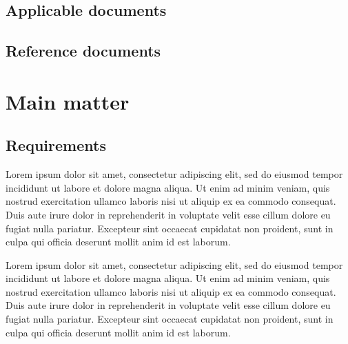 \documentclass[12pt,a4paper]{report}
\begin{document}
\section{Applicable documents}
\begin{ADlist}
\end{ADlist}


\section{Reference documents}
\begin{RDlist}
\end{RDlist}



\chapter{Main matter}

\section{Requirements}
Lorem ipsum dolor sit amet, consectetur adipiscing elit, sed do eiusmod tempor incididunt ut labore et dolore magna aliqua. Ut enim ad minim veniam, quis nostrud exercitation ullamco laboris nisi ut aliquip ex ea commodo consequat. Duis aute irure dolor in reprehenderit in voluptate velit esse cillum dolore eu fugiat nulla pariatur. Excepteur sint occaecat cupidatat non proident, sunt in culpa qui officia deserunt mollit anim id est laborum.

Lorem ipsum dolor sit amet, consectetur adipiscing elit, sed do eiusmod tempor incididunt ut labore et dolore magna aliqua. Ut enim ad minim veniam, quis nostrud exercitation ullamco laboris nisi ut aliquip ex ea commodo consequat. Duis aute irure dolor in reprehenderit in voluptate velit esse cillum dolore eu fugiat nulla pariatur. Excepteur sint occaecat cupidatat non proident, sunt in culpa qui officia deserunt mollit anim id est laborum.
\end{document}
